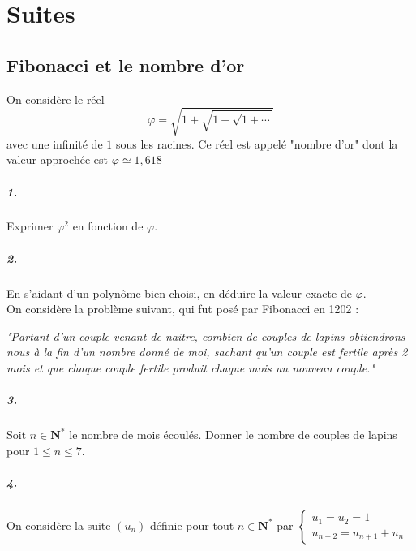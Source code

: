 \chapter{Suites}

	\section{Fibonacci et le nombre d'or}
	
		On considère le réel
		\[
			\varphi = \sqrt{1 + \sqrt{1 + \sqrt{1 +\cdots}}}
		\]
		avec une infinité de $1$ sous les racines. Ce réel est appelé "nombre d'or" dont la valeur approchée est $\varphi \simeq 1,618$
		
		\paragraph{1.} Exprimer $\varphi^2$ en fonction de $\varphi$.
		
		\paragraph{2.} En s'aidant d'un polynôme bien choisi, en déduire la valeur exacte de $\varphi$. \medskip \\
		
		On considère la problème suivant, qui fut posé par Fibonacci en 1202 : \\
		
		\begin{minipage}{0.86\textwidth}
			\centering
			\emph{"Partant d'un couple venant de naitre, combien de couples de lapins obtiendrons-nous à la fin d'un nombre donné de moi, sachant qu'un couple est fertile après 2 mois et que chaque couple fertile produit chaque mois un nouveau couple."}
		\end{minipage}
		
		\paragraph{3.} Soit $n\in \mathbf{N}^*$ le nombre de mois écoulés. Donner le nombre de couples de lapins pour $1 \leqslant n \leqslant 7$.
		
		\paragraph{4.} On considère la suite $(u_n)$ définie pour tout $n \in \mathbf{N}^*$ par 
		$\left\{ \begin{array}{l}
			u_1 = u_2 = 1 \\
			u_{n+2} = u_{n+1} + u_n
		\end{array} \right. $ \\
		
